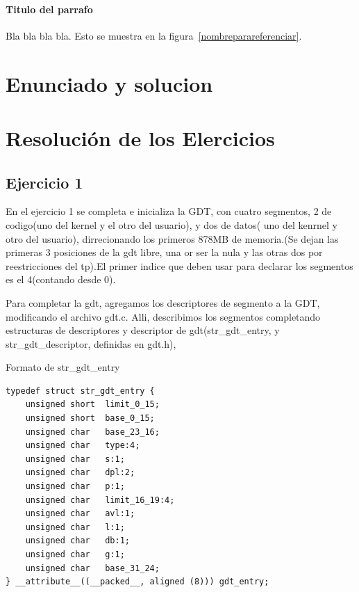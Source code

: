 \documentclass[a4paper]{article}
\newenvironment{codesnippet}{%
	\begin{Sbox}\begin{minipage}{\textwidth}\sffamily\small}%
	{\end{minipage}\end{Sbox}%
		\begin{center}%
		\vspace{-0.4cm}\colorbox{litegrey}{\TheSbox}\end{center}\vspace{0.3cm}}
\begin{document}
\paragraph{\textbf{Titulo del parrafo} } Bla bla bla bla.
Esto se muestra en la figura~\ref{nombreparareferenciar}.






\section{Enunciado y solucion} 
%

\newpage
\section{Resolución de los Elercicios}
\subsection{Ejercicio 1}

En el ejercicio 1 se completa e inicializa la GDT, con cuatro segmentos, 2 de codigo(uno del kernel y el otro del usuario), y dos de datos( uno del kenrnel y otro del usuario), dirrecionando los primeros 878MB de memoria.(Se dejan las primeras 3 posiciones de la gdt libre, una or ser la nula y las otras dos por reestricciones del tp).El primer indice que deben usar para declarar los segmentos es el 4(contando desde 0).


Para completar la gdt, agregamos los descriptores de segmento a la GDT, modificando el archivo gdt.c.
Alli, describimos los segmentos completando  estructuras de descriptores y descriptor de gdt(str_gdt_entry, y  str_gdt_descriptor, definidas en gdt.h),


Formato de str_gdt_entry

\begin{codesnippet}
\begin{verbatim}
typedef struct str_gdt_entry {
    unsigned short  limit_0_15;
    unsigned short  base_0_15;
    unsigned char   base_23_16;
    unsigned char   type:4;
    unsigned char   s:1;
    unsigned char   dpl:2;
    unsigned char   p:1;
    unsigned char   limit_16_19:4;
    unsigned char   avl:1;
    unsigned char   l:1;
    unsigned char   db:1;
    unsigned char   g:1;
    unsigned char   base_31_24;
} __attribute__((__packed__, aligned (8))) gdt_entry;    
\end{verbatim}
\end{codesnippet}
\end{document}
